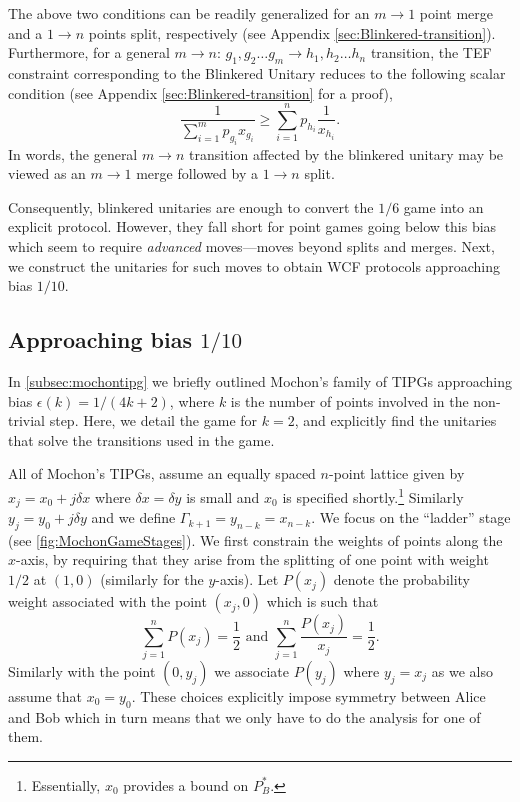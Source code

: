 \documentclass{article}
\newcommand{\atul}[1]{#1} %
\begin{document}
The above two conditions can be readily generalized for an $m\to1$ point merge and a $1\to n$ points split, respectively (see Appendix \cref{sec:Blinkered-transition}). Furthermore, for a general $m\to n$: $g_{1},g_{2}\dots g_{m}\to h_{1},h_{2}\dots h_{n}$ transition, the TEF constraint corresponding to the Blinkered Unitary reduces to the following scalar condition (see Appendix \cref{sec:Blinkered-transition} for a proof),
$$
  \frac{1}{\sum_{i=1}^{m}p_{g_{i}}x_{g_{i}}}\ge\sum_{i=1}^{n}p_{h_{i}}\frac{1}{x_{h_{i}}}.
$$
In words, the general $m\to n$ transition affected by the blinkered unitary may be viewed as an $m\to 1$ merge followed by a $1\to n$ split.

Consequently, blinkered unitaries are enough to convert the
$1/6$ game into an explicit protocol. However, they fall short for point games going below this bias which seem to require \emph{advanced} moves---moves beyond splits and merges. Next, we construct the unitaries for such moves to obtain WCF protocols approaching bias $1/10$.
%
%
%

%
%
\subsection{Approaching bias \texorpdfstring{$1/10$}{1/10}} \label{subsec:Bias1by10gameprotocol}

In \cref{subsec:mochontipg} we briefly outlined
Mochon's family of TIPGs approaching bias $\epsilon(k)=1/(4k+2)$, where $k$ is the number of points involved in the non-trivial step. Here, we detail the game for
$k=2$, and explicitly find the unitaries that solve the transitions used in the game.
%

%
%
%

All of Mochon's TIPGs, assume an equally spaced $n$-point lattice given by $x_{j}=x_{0}+j\delta x$
where $\delta x=\delta y$ is small and $x_{0}$ is specified shortly.\footnote{Essentially, $x_0$ provides a bound on $P^*_B$.} Similarly $y_{j}=y_{0}+j\delta y$ and we define $\Gamma_{k+1}=y_{n-k}=x_{n-k}$. We focus on the ``ladder'' stage \atul{(see  \cref{fig:MochonGameStages})}. We first constrain the weights of points along the $x$-axis, by requiring that they arise from the splitting of one point with weight $1/2$ at $(1,0)$ (similarly for the $y$-axis). Let $P(x_{j})$ denote the probability weight associated with the point $(x_{j},0)$ which is such that \begin{displaymath}
  \sum_{j=1}^{n}P(x_{j})=\frac{1}{2} \text{ and }\sum_{j=1}^{n}\frac{P(x_{j})}{x_{j}}=\frac{1}{2}.
\end{displaymath}
Similarly with the point $(0,y_{j})$ we associate $P(y_{j})$ where
$y_{j}=x_{j}$ as we also assume that $x_{0}=y_{0}$. These choices
explicitly impose symmetry between Alice and Bob which in turn means
that we only have to do the analysis for one of them.
\end{document}
